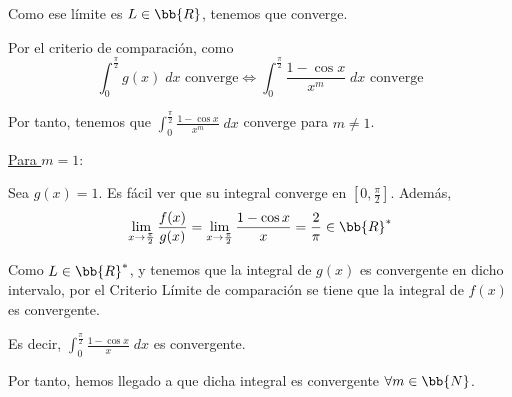 \begin{ejercicio}
\begin{enumerate}
\begin{itemize}
    Como ese límite es $L \in \bb{R}$, tenemos que converge.

    Por el criterio de comparación, como 
    \begin{equation*}
        \int_0^{\frac{\pi}{2}} g(x)\;dx \text{ converge} \Longleftrightarrow 
        \int_0^{\frac{\pi}{2}} \frac{1-\cos x}{x^m} \;dx \text{ converge}
    \end{equation*}

    Por tanto, tenemos que  $\displaystyle \int_0^{\frac{\pi}{2}} \frac{1-\cos x}{x^m} \;dx$ converge para $m\neq 1$.


    \underline{Para $m=1$}:

    Sea $g(x)=1$. Es fácil ver que su integral converge en $\left[0,\frac{\pi}{2}\right]$. Además,
    \begin{equation*}
        \lim_{x\to \frac{\pi}{2}} \frac{f(x)}{g(x)}
        = \lim_{x\to \frac{\pi}{2}} \frac{1-\cos x}{x} = \frac{2}{\pi} \in \bb{R}^\ast
    \end{equation*}

    Como $L\in \bb{R}^\ast$, y tenemos que la integral de $g(x)$ es convergente en dicho intervalo, por el Criterio Límite de comparación se tiene que la integral de $f(x)$ es convergente.


    Es decir, $\displaystyle \int_0^{\frac{\pi}{2}}\frac{1-\cos x}{x}\;dx$ es convergente.
    \end{itemize}

    Por tanto, hemos llegado a que dicha integral es convergente $\forall m\in \bb{N}$.
\end{enumerate}

\renewcommand{\labelenumi}{\arabic{enumi}.}
    
\end{ejercicio}